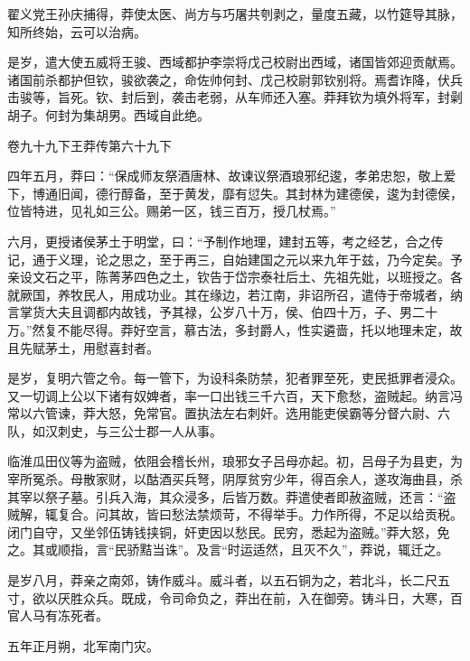 \documentclass[12pt,UTF8]{ctexbook}
\begin{document}
翟义党王孙庆捕得，莽使太医、尚方与巧屠共刳剥之，量度五藏，以竹筵导其脉，知所终始，云可以治病。



是岁，遣大使五威将王骏、西域都护李崇将戊己校尉出西域，诸国皆郊迎贡献焉。诸国前杀都护但钦，骏欲袭之，命佐帅何封、戊己校尉郭钦别将。焉耆诈降，伏兵击骏等，旨死。钦、封后到，袭击老弱，从车师还入塞。莽拜钦为填外将军，封劋胡子。何封为集胡男。西域自此绝。





卷九十九下王莽传第六十九下



四年五月，莽曰：“保成师友祭酒唐林、故谏议祭酒琅邪纪逡，孝弟忠恕，敬上爱下，博通旧闻，德行醇备，至于黄发，靡有愆失。其封林为建德侯，逡为封德侯，位皆特进，见礼如三公。赐弟一区，钱三百万，授几杖焉。”



六月，更授诸侯茅土于明堂，曰：“予制作地理，建封五等，考之经艺，合之传记，通于义理，论之思之，至于再三，自始建国之元以来九年于兹，乃今定矣。予亲设文石之平，陈菁茅四色之土，钦告于岱宗泰社后土、先祖先妣，以班授之。各就厥国，养牧民人，用成功业。其在缘边，若江南，非诏所召，遣侍于帝城者，纳言掌货大夫且调都内故钱，予其禄，公岁八十万，侯、伯四十万，子、男二十万。”然复不能尽得。莽好空言，慕古法，多封爵人，性实遴啬，托以地理未定，故且先赋茅土，用慰喜封者。



是岁，复明六管之令。每一管下，为设科条防禁，犯者罪至死，吏民抵罪者浸众。又一切调上公以下诸有奴婢者，率一口出钱三千六百，天下愈愁，盗贼起。纳言冯常以六管谏，莽大怒，免常官。置执法左右刺奸。选用能吏侯霸等分督六尉、六队，如汉刺史，与三公士郡一人从事。



临淮瓜田仪等为盗贼，依阻会稽长州，琅邪女子吕母亦起。初，吕母子为县吏，为宰所冤杀。母散家财，以酤酒买兵弩，阴厚贫穷少年，得百余人，遂攻海曲县，杀其宰以祭子墓。引兵入海，其众浸多，后皆万数。莽遣使者即赦盗贼，还言：“盗贼解，辄复合。问其故，皆曰愁法禁烦苛，不得举手。力作所得，不足以给贡税。闭门自守，又坐邻伍铸钱挟铜，奸吏因以愁民。民穷，悉起为盗贼。”莽大怒，免之。其或顺指，言“民骄黠当诛”。及言“时运适然，且灭不久”，莽说，辄迁之。



是岁八月，莽亲之南郊，铸作威斗。威斗者，以五石铜为之，若北斗，长二尺五寸，欲以厌胜众兵。既成，令司命负之，莽出在前，入在御旁。铸斗日，大寒，百官人马有冻死者。



五年正月朔，北军南门灾。
\end{document}
